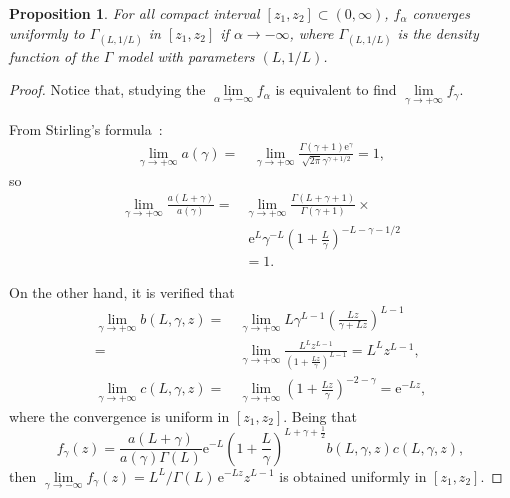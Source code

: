\documentclass[journal]{IEEEtran}
\newtheorem{proposition}{Proposition}
\numberwithin{equation}{section}
\newenvironment{dem}[1][Proof]{\begin{proof}[{\it #1}]}{\end{proof}}
\newcommand{\e}{\mathrm{e}}
\newcommand{\al}{&\,}
\newcommand{\pa}[1]{\ensuremath{\left( #1 \right)}}
\begin{document}

\vspace{0.2cm}

\begin{proposition}	\label{pr: convergenciauniforme1}
	For all compact interval $[z_{1},z_{2}]\subset\pa{0,\infty}$, $f_{\alpha}$ converges uniformly to $\Gamma_{(L,1/L)}$ in $[z_{1},z_{2}]$ if $\alpha\to -\infty$,
	where $\Gamma_{(L,1/L)}$ is the density function of the $\Gamma$ model with parameters $\pa{L,1/L}$.
\end{proposition}

\begin{dem}
	Notice that, studying the $\lim\limits_{\alpha\to-\infty} f_{\alpha}$ is equivalent to find
	$\lim\limits_{\gamma\to+\infty} f_{\gamma}.$

	
From Stirling's formula~\cite{abramowitz1964}:
\begin{align*}
\lim_{\gamma\to+\infty} a\pa{\gamma} = 
\al \lim_{\gamma\to+\infty}\frac{\Gamma\pa{\gamma+1}\e^{\gamma}}{\sqrt{2\pi}\gamma^{\gamma+1/2}} = 1,
\end{align*}
so
\begin{align*}
\lim_{\gamma\to+\infty} \frac{a\pa{L+\gamma}}{a\pa{\gamma}} = &
\lim_{\gamma\to+\infty}\frac{\Gamma\pa{L+\gamma+1}}{\Gamma\pa{\gamma+1}}\times\\
& \; \e^{L}\gamma^{-L}\pa{1+\frac{L}{\gamma}}^{-L-\gamma-1/2} \\
&= 1.
\end{align*}

On the other hand, it is verified that
\begin{align*}
\lim_{\gamma\to+\infty} b\pa{L,\gamma,z} =
\al \lim_{\gamma\to+\infty}L\gamma^{L-1}\pa{\frac{Lz}{\gamma+Lz}}^{L-1} \\
= \al \lim_{\gamma\to+\infty} \frac{L^{L} z^{L-1}}{\pa{1+\frac{Lz}{\gamma}}^{L-1}} = L^{L} z^{L-1},\\
\lim_{\gamma\to+\infty} c\pa{L,\gamma,z} = \al \lim_{\gamma\to+\infty}\pa{1+\frac{Lz}{\gamma}}^{-2-\gamma} = \e^{-Lz},
\end{align*}
where the convergence is uniform in $[z_{1},z_{2}]$.
Being that
$$
f_{\gamma}\pa{z} = \frac{a\pa{L+\gamma}}{a\pa{\gamma}\Gamma\pa{L}}\e^{-L}\pa{1+\frac{L}{\gamma}}^{L+\gamma+\frac 1 2}
b\pa{L,\gamma,z}c\pa{L,\gamma,z},
$$
	then $\lim\limits_{\gamma\to-\infty} f_{\gamma}\pa{z} = L^{L}/\Gamma\pa{L}\,\e^{-Lz}z^{L-1}$
	is obtained uniformly in $[z_{1},z_{2}]$.
\end{dem}
\end{document}
